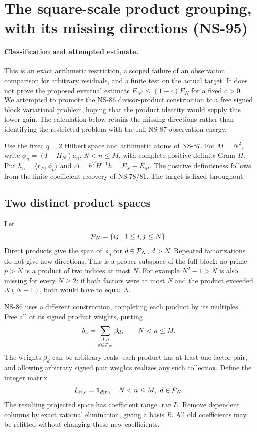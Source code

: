 \section{The square-scale product grouping, with its missing directions (NS-95)}
\paragraph{Classification and attempted estimate.}
This is an exact arithmetic restriction, a scoped failure of an observation
comparison for arbitrary residuals, and a finite test on the actual target.
It does not prove the proposed eventual estimate
$E_{N^2}\le(1-c)E_N$ for a fixed $c>0$. We attempted to promote the
NS-86 divisor-product construction to a free signed block variational
problem, hoping that the product identity would supply this lower gain.
The calculation below retains the missing directions rather than identifying
the restricted problem with the full NS-87 observation energy.

Use the fixed $q=2$ Hilbert space and arithmetic atoms of NS-87. For
$M=N^2$, write $\phi_n=(I-\Pi_N)a_n$, $N<n\le M$, with complete
positive definite Gram $H$. Put $h_n=\langle r_N,\phi_n\rangle$ and
$\Delta=h^TH^{-1}h=E_N-E_M$. The positive definiteness follows from
the finite coefficient recovery of NS-78/81. The target is fixed throughout.

\subsection{Two distinct product spaces}
Let
\[
 {\cal P}_N=\{ij:1\le i,j\le N\}.
\]
Direct products give the span of $\phi_d$ for $d\in{\cal P}_N$, $d>N$.
Repeated factorizations do not give new directions. This is a proper
subspace of the full block: no prime $p>N$ is a product of two indices
at most $N$. For example $N^2-1>N$ is also missing for every $N\ge2$:
if both factors were at most $N$ and the product exceeded $N(N-1)$,
both would have to equal $N$.

NS-86 uses a different construction, completing each product by its
multiples. Free all of its signed product weights, putting
\[
 b_n=\sum_{\substack{d\mid n\\d\in{\cal P}_N}}\beta_d,
 \qquad N<n\le M.
\]
The weights $\beta_d$ can be arbitrary reals: each product has at least
one factor pair, and allowing arbitrary signed pair weights realizes any
such collection. Define the integer matrix
\[
 L_{n,d}=\boldsymbol1_{d\mid n},\quad
 N<n\le M,\ d\in{\cal P}_N.
\]
The resulting projected space has coefficient range $\operatorname{ran}L$.
Remove dependent columns by exact rational elimination, giving a basis $B$.
All old coefficients may be refitted without changing these new coefficients.

